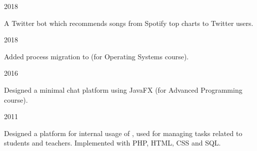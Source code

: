 

\begin{cvprojects}

  \cvproject
    {} %
    {} %
    {} %
    {2018} %
    {
      \begin{cvitems} %
        \item {A Twitter bot which recommends songs from Spotify top charts to Twitter users.}
      \end{cvitems}
    }

  \cvproject
    {} %
    {} %
    {} %
    {2018} %
    {
      \begin{cvitems} %
        \item {Added process migration to  (for Operating Systems course).}
      \end{cvitems}
    }

  \cvproject
    {} %
    {} %
    {} %
    {2016} %
    {
      \begin{cvitems} %
        \item {Designed a minimal chat platform using JavaFX (for Advanced Programming course).}
      \end{cvitems}
    }



  \cvproject
    {} %
    {} %
    {} %
    {2011} %
    {
      \begin{cvitems} %
        \item {Designed a platform for internal usage of , used for managing tasks related to students and teachers. Implemented with PHP, HTML, CSS and SQL.}
      \end{cvitems}
    }


\end{cvprojects}
